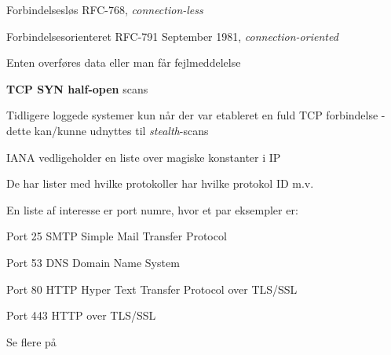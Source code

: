 \documentclass[Screen16to9,17pt]{foils}
\begin{document}




\begin{list1}
\item Forbindelsesløs RFC-768, \emph{connection-less}
\end{list1}




\begin{list1}
\item Forbindelsesorienteret RFC-791 September 1981, \emph{connection-oriented}
\item Enten overføres data eller man får fejlmeddelelse
\end{list1}




\begin{list2}
\item {\bfseries TCP SYN half-open} scans
\item Tidligere loggede systemer kun når der var etableret en fuld TCP
  forbindelse - dette kan/kunne udnyttes til \emph{stealth}-scans
\end{list2}






\begin{list1}
\item IANA vedligeholder en liste over magiske konstanter i IP
\item De har lister med hvilke protokoller har hvilke protokol ID m.v.
\item En liste af interesse er port numre, hvor et par eksempler er:
\begin{list2}
\item Port 25 SMTP Simple Mail Transfer Protocol
\item Port 53 DNS Domain Name System
\item Port 80 HTTP Hyper Text Transfer Protocol over TLS/SSL
\item Port 443 HTTP over TLS/SSL
\end{list2}
\item Se flere på 
\end{list1}
\end{document}
